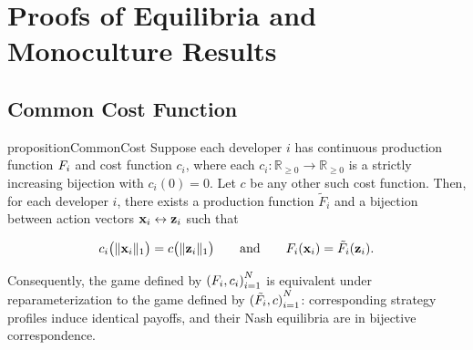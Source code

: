 \section{Proofs of Equilibria and Monoculture Results}
\label{app:proofs}
\subsection{Common Cost Function}
\label{app:CommonCost_proof}
\begin{restatable}{proposition}{CommonCost}
\label{prop:CommonCost}
Suppose each developer $i$ has continuous production function $F_i$ and cost function $c_i$, where each $c_i:\mathbb{R}_{\ge 0}\to\mathbb{R}_{\ge 0}$ is a strictly increasing bijection with $c_i(0)=0$. Let $c$ be any other such cost function. Then, for each developer $i$, there exists a production function $\tilde{F}_i$ and a bijection between action vectors $\mathbf{x}_i \leftrightarrow\mathbf{z}_i$ such that

$$
c_i\big(\lVert\mathbf{x}_i\rVert_1\big)=c\big(\lVert\mathbf{z}_i\rVert_1\big)
\qquad\text{and}\qquad
F_i(\mathbf{x}_i)=\tilde{F}_i(\mathbf{z}_i).
$$

Consequently, the game defined by ${(F_i,c_i)}_{i=1}^{N}$ is equivalent under reparameterization to the game defined by ${(\tilde {F_i},c)}_{i=1}^{N}$: corresponding strategy profiles induce identical payoffs, and their Nash equilibria are in bijective correspondence.
\end{restatable}
